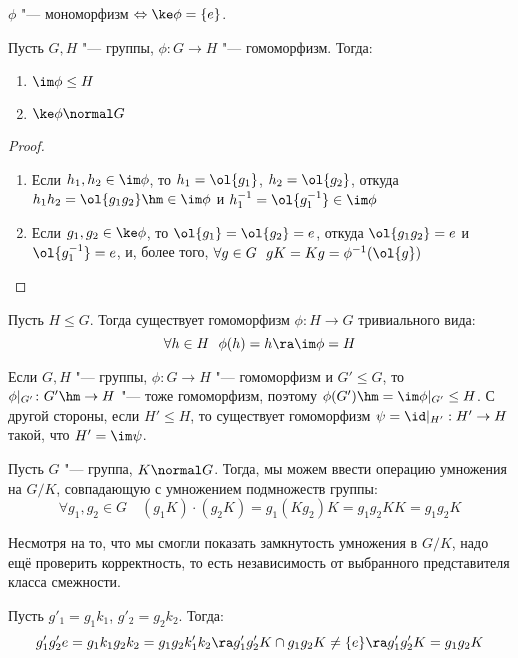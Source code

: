 \begin{corollary}
	$\phi$ "--- мономорфизм $\Leftrightarrow \ke \phi = \{e\}$.
\end{corollary}

\begin{proposition}
	Пусть $G, H$ "--- группы, $\phi: G \to H$ "--- гомоморфизм. Тогда:
	\begin{enumerate}
		\item $\im \phi \le H$
		\item $\ke \phi \normal G$
	\end{enumerate}
\end{proposition}

\begin{proof}~
	\begin{enumerate}
		\item Если $h_1, h_2 \in \im \phi$, то $h_1 = \ol{g_1}$, $h_2 = \ol{g_2}$, откуда $h_1h_2 = \ol{g_1g_2} \hm\in \im \phi$ и $h_1^{-1} = \ol{g_1^{-1}} \in \im \phi$
		\item Если $g_1, g_2 \in \ke \phi$, то $\ol{g_1} = \ol{g_2} = e$, откуда $\ol{g_1g_2} = e$ и $\ol{g_1^{-1}} = e$, и, более того, $\forall g \in G\ \ gK = Kg = \phi^{-1}(\ol{g})$
	\end{enumerate}
\end{proof}

\begin{note}
	Пусть $H \le G$. Тогда существует гомоморфизм $\phi \colon H \to G$ тривиального вида:
	\[
		\forall h \in H\ \ \phi(h) = h \ra \im \phi = H
	\]
\end{note}

\begin{note}
	Если $G, H$ "--- группы, $\phi: G \to H$ "--- гомоморфизм и $G' \le G$, то $\phi|_{G'} \colon G' \hm\to H$ "--- тоже гомоморфизм, поэтому $\phi(G') \hm= \im \phi|_{G'} \le H$. С другой стороны, если $H' \le H$, то существует гомоморфизм $\psi = \id|_{H'}: H' \to H$ такой, что $H' = \im\psi$.
\end{note}

\begin{definition}
	Пусть $G$ "--- группа, $K \normal G$. Тогда, мы можем ввести операцию умножения на $G / K$, совпадающую с умножением подмножеств группы:
	\[
		\forall g_1, g_2 \in G \quad (g_1 K) \cdot (g_2 K) = g_1 (K g_2) K = g_1 g_2 K K = g_1 g_2 K
	\]
\end{definition}

\begin{note}
	Несмотря на то, что мы смогли показать замкнутость умножения в $G / K$, надо ещё проверить корректность, то есть независимость от выбранного представителя класса смежности.
	
	Пусть $g'_1 = g_1k_1$, $g'_2 = g_2k_2$. Тогда:
	\[
		g'_1 g'_2 e = g_1 k_1 g_2 k_2 = g_1 g_2 k'_1 k_2 \ra g'_1 g'_2 K \cap g_1 g_2 K \neq \{e\} \ra g'_1 g'_2 K = g_1 g_2 K
	\]
\end{note}

